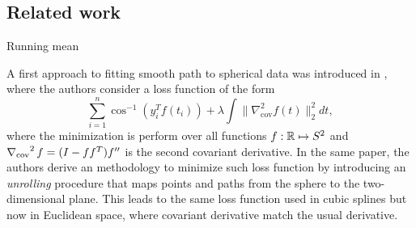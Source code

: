 \subsection{Related work}

Running mean

A first approach to fitting smooth path to spherical data was introduced in \cite{Jupp-1987-spherical}, where the authors consider a loss function of the form 
\begin{equation}
    \sum_{i=1}^n \cos^{-1}(y_i^T f(t_i))
    + 
    \lambda
    \int \| \nabla_\text{cov}^2 f(t) \|_2^2 dt,
    \label{eq:jupp_splines_sphere}
\end{equation}
where the minimization is perform over all functions $f: \operatorname{\mathbb{R}} \mapsto S^2$ and $\operatorname{\nabla_\text{cov}}^2 f  = (I - ff^T) f''$ is the second covariant derivative. In the same paper, the authors derive an methodology to minimize such loss function by introducing an \textit{unrolling} procedure that maps points and paths from the sphere to the two-dimensional plane. This leads to the same loss function used in cubic splines but now in Euclidean space, where covariant derivative match the usual derivative. 